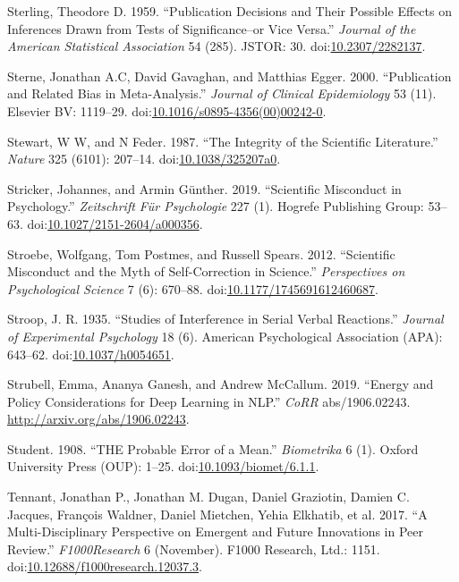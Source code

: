 \documentclass[a5paper]{book}
\begin{document}
\hypertarget{ref-doi:10.2307ux2f2282137}{}
Sterling, Theodore D. 1959. ``Publication Decisions and Their Possible
Effects on Inferences Drawn from Tests of Significance--or Vice Versa.''
\emph{Journal of the American Statistical Association} 54 (285). JSTOR:
30. doi:\href{https://doi.org/10.2307/2282137}{10.2307/2282137}.

\hypertarget{ref-doi:10.1016ux2fs0895-43560000242-0}{}
Sterne, Jonathan A.C, David Gavaghan, and Matthias Egger. 2000.
``Publication and Related Bias in Meta-Analysis.'' \emph{Journal of
Clinical Epidemiology} 53 (11). Elsevier BV: 1119--29.
doi:\href{https://doi.org/10.1016/s0895-4356(00)00242-0}{10.1016/s0895-4356(00)00242-0}.

\hypertarget{ref-doi:10.1038ux2f325207a0}{}
Stewart, W W, and N Feder. 1987. ``The Integrity of the Scientific
Literature.'' \emph{Nature} 325 (6101): 207--14.
doi:\href{https://doi.org/10.1038/325207a0}{10.1038/325207a0}.

\hypertarget{ref-doi:10.1027ux2f2151-2604ux2fa000356}{}
Stricker, Johannes, and Armin Günther. 2019. ``Scientific Misconduct in
Psychology.'' \emph{Zeitschrift Für Psychologie} 227 (1). Hogrefe
Publishing Group: 53--63.
doi:\href{https://doi.org/10.1027/2151-2604/a000356}{10.1027/2151-2604/a000356}.

\hypertarget{ref-doi:10.1177ux2f1745691612460687}{}
Stroebe, Wolfgang, Tom Postmes, and Russell Spears. 2012. ``Scientific
Misconduct and the Myth of Self-Correction in Science.''
\emph{Perspectives on Psychological Science} 7 (6): 670--88.
doi:\href{https://doi.org/10.1177/1745691612460687}{10.1177/1745691612460687}.

\hypertarget{ref-doi:10.1037ux2fh0054651}{}
Stroop, J. R. 1935. ``Studies of Interference in Serial Verbal
Reactions.'' \emph{Journal of Experimental Psychology} 18 (6). American
Psychological Association (APA): 643--62.
doi:\href{https://doi.org/10.1037/h0054651}{10.1037/h0054651}.

\hypertarget{ref-DBLP:journalsux2fcorrux2fabs-1906-02243}{}
Strubell, Emma, Ananya Ganesh, and Andrew McCallum. 2019. ``Energy and
Policy Considerations for Deep Learning in NLP.'' \emph{CoRR}
abs/1906.02243. \url{http://arxiv.org/abs/1906.02243}.

\hypertarget{ref-doi:10.1093ux2fbiometux2f6.1.1}{}
Student. 1908. ``THE Probable Error of a Mean.'' \emph{Biometrika} 6
(1). Oxford University Press (OUP): 1--25.
doi:\href{https://doi.org/10.1093/biomet/6.1.1}{10.1093/biomet/6.1.1}.

\hypertarget{ref-doi:10.12688ux2ff1000research.12037.3}{}
Tennant, Jonathan P., Jonathan M. Dugan, Daniel Graziotin, Damien C.
Jacques, François Waldner, Daniel Mietchen, Yehia Elkhatib, et al. 2017.
``A Multi-Disciplinary Perspective on Emergent and Future Innovations in
Peer Review.'' \emph{F1000Research} 6 (November). F1000 Research, Ltd.:
1151.
doi:\href{https://doi.org/10.12688/f1000research.12037.3}{10.12688/f1000research.12037.3}.
\end{document}
